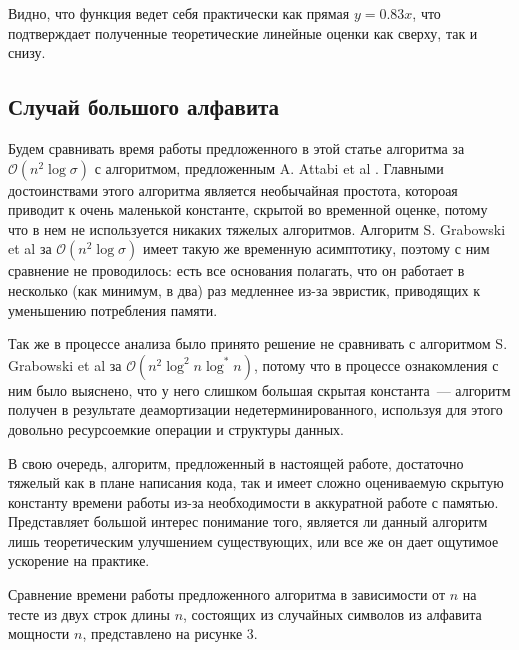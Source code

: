 Видно, что функция ведет себя практически как прямая $y=0.83x$, что подтверждает полученные теоретические линейные оценки как сверху, так и снизу.


\subsection{Случай большого алфавита}

Будем сравнивать время работы предложенного в этой статье алгоритма за $\mathcal{O}(n^2 \log \sigma)$ с алгоритмом, предложенным A. Attabi et al \cite{1}. Главными достоинствами этого алгоритма является необычайная простота, котороая приводит к очень маленькой константе, скрытой во временной оценке, потому что в нем не используется никаких тяжелых алгоритмов. Алгоритм S. Grabowski et al \cite{4} за $\mathcal{O}
(n^2 \log \sigma)$ имеет такую же временную асимптотику, поэтому с ним сравнение не проводилось: есть все основания полагать, что он работает в несколько (как минимум, в два) раз медленнее из-за эвристик, приводящих к уменьшению потребления памяти.

Так же в процессе анализа было принято решение не сравнивать с алгоритмом S. Grabowski et al \cite{4} за $\mathcal{O}(n^2 \log^2 n \log^* n)$, потому что в процессе ознакомления с ним было выяснено, что у него слишком большая скрытая константа~--- алгоритм получен в результате деамортизации недетерминированного, используя для этого довольно ресурсоемкие операции и структуры данных.

В свою очередь, алгоритм, предложенный в настоящей работе, достаточно тяжелый как в плане написания кода, так и имеет сложно оцениваемую скрытую константу времени работы из-за необходимости в аккуратной работе с памятью. Представляет большой интерес понимание того, является ли данный алгоритм лишь теоретическим улучшением существующих, или все же он дает ощутимое ускорение на практике.

Сравнение времени работы предложенного алгоритма в зависимости от $n$ на тесте из двух строк длины $n$, состоящих из случайных символов из алфавита мощности $n$, представлено на рисунке 3.

